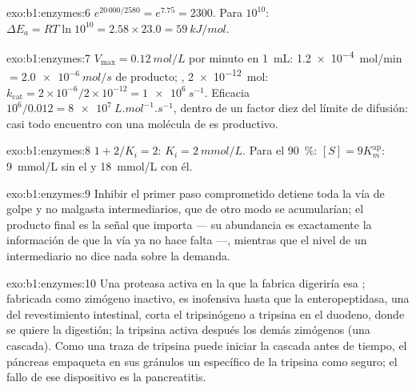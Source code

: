 \begin{solution}{exo:b1:enzymes:6}
$e^{20\,000/2580} = e^{7.75} = 2300$. Para $10^{10}$: $\Delta E_a =
RT\ln 10^{10} = 2.58\times 23.0 = \qty{59}{kJ/mol}$.
\end{solution}

\begin{solution}{exo:b1:enzymes:7}
$V_{\max} = \qty{0.12}{mol/L}$ por minuto en \qty{1}{mL}:
\qty{1.2e-4}{mol/min} $= \qty{2.0e-6}{mol/s}$ de producto; ,
\qty{2e-12}{mol}: $k_{\text{cat}} = 2\times 10^{-6}/2\times 10^{-12} =
\qty{1e6}{s^{-1}}$. Eficacia $10^6/0.012 = \qty{8e7}{L.mol^{-1}.s^{-1}}$,
dentro de un factor diez del límite de difusión: casi todo encuentro con una
molécula de  es productivo.
\end{solution}

\begin{solution}{exo:b1:enzymes:8}
$1 + 2/K_i = 2$: $K_i = \qty{2}{mmol/L}$. Para el \qty{90}{\%}:
$[S] = 9K_m^{\text{ap}}$: \qty{9}{mmol/L} sin el  y
\qty{18}{mmol/L} con él.
\end{solution}

\begin{solution}{exo:b1:enzymes:9}
Inhibir el primer paso comprometido detiene toda la vía de golpe y no
malgasta intermediarios, que de otro modo se acumularían; el producto final
es la señal que importa --- su abundancia es exactamente la información de
que la vía ya no hace falta ---, mientras que el nivel de un intermediario
no dice nada sobre la demanda.
\end{solution}

\begin{solution}{exo:b1:enzymes:10}
Una proteasa activa en la  que la fabrica digeriría esa ;
fabricada como zimógeno inactivo, es inofensiva hasta que la
enteropeptidasa, una  del revestimiento intestinal, corta el
tripsinógeno a tripsina en el duodeno, donde se quiere la digestión; la
tripsina activa después los demás zimógenos (una cascada). Como una traza de
tripsina puede iniciar la cascada antes de tiempo, el páncreas empaqueta en
sus gránulos un  específico de la tripsina como seguro; el fallo de
ese dispositivo es la pancreatitis.
\end{solution}

